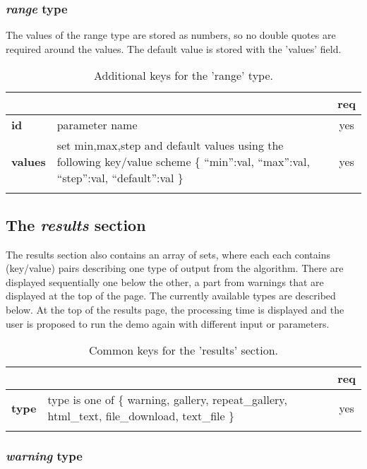 \subsubsection{ \emph{range} type}

The values of the range type are stored as numbers, so no double quotes are 
required around the values. The default value is stored with the 'values' field.

\begin{longtable}{|>{\bf}L{\linewidth}|L{\linewidth}|c|}
\hline
      &  & {\bf req} 
\tabularnewline \hline \hline
 id     & parameter name  & yes \\ \hline
 values & set min,max,step and default values using the following key/value 
scheme \{ ``min'':val, ``max'':val, ``step'':val, ``default'':val \} & yes
                      \\ \hline
\caption{Additional keys for the 'range' type.}
\end{longtable}

\subsection{The \emph{results} section}


The results section also contains an array of sets, where each each contains 
(key/value) pairs describing one type of output from the algorithm. There are 
displayed sequentially one below the other, a part from warnings that are 
displayed at the top of the page. The currently available types are described 
below. At the top of the results page, the processing time is displayed and the 
user is proposed to run the demo again with different input or parameters.

\begin{longtable}{|>{\bf}L{\linewidth}|L{\linewidth}|c|}
\hline
      &  & {\bf req} 
\tabularnewline \hline \hline
 type      & type is one of \{  warning, gallery, repeat\_gallery, html\_text, 
                                file\_download, text\_file \}  & yes \\ \hline
\caption{Common keys for the 'results' section.}
\end{longtable}


\subsubsection{ \emph{warning} type}

